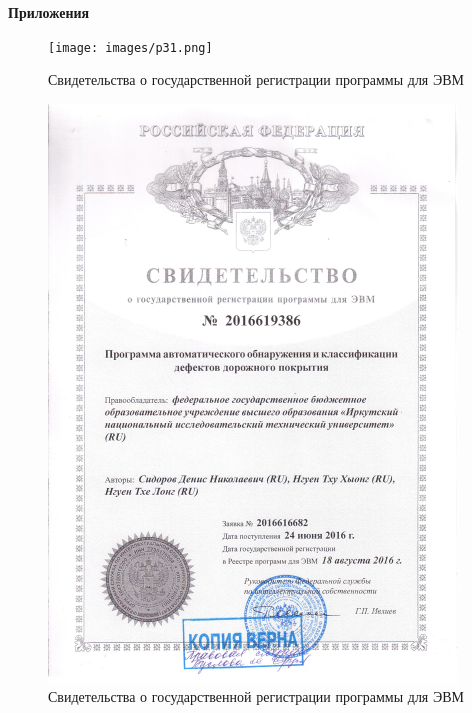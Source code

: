 \begin{center}
\textbf{Приложения}
\end{center}
\begin{figure}[ht!]
\centering
\texttt{[image: images/p31.png]}
\begin{center}
\caption{Свидетельства о государственной регистрации
программы для ЭВМ} \label{imgp31}
\end{center}
\end{figure}

\begin{figure}[ht!]
\centering
\includegraphics [scale=0.8] {images/p25.png}
\begin{center}
\caption{Свидетельства о государственной регистрации
программы для ЭВМ} \label{imgp25}
\end{center}
\end{figure}


